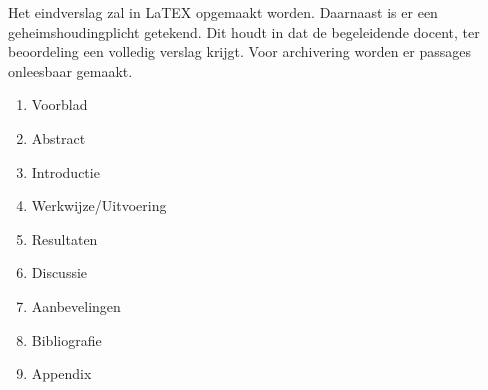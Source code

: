 Het eindverslag zal in LaTEX opgemaakt worden. Daarnaast is er een geheimshoudingplicht getekend. Dit houdt in dat de begeleidende docent, ter beoordeling een volledig verslag krijgt. Voor archivering worden er passages onleesbaar gemaakt. 

\begin{enumerate}
	\item Voorblad
	\item Abstract
	\item Introductie
	\item Werkwijze/Uitvoering
	\item Resultaten
	\item Discussie
	\item Aanbevelingen
	\item Bibliografie
	\item Appendix
\end{enumerate}